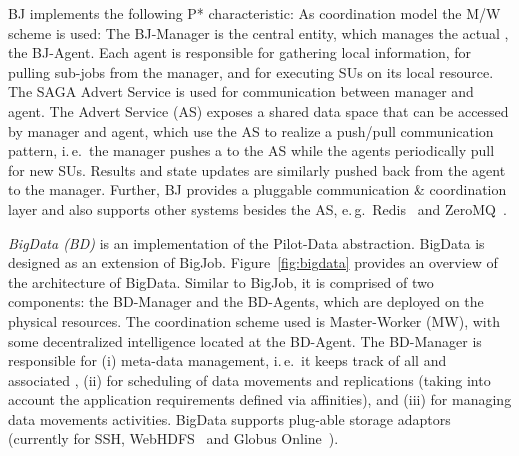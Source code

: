 \documentclass[conference]{IEEEtran}
\begin{document}
BJ implements the following P* characteristic: As coordination model
the M/W scheme is used: The BJ-Manager is the central entity, which
manages the actual \pilot, the BJ-Agent. Each agent is responsible for
gathering local information, for pulling sub-jobs from the manager,
and for executing SUs on its local resource. The SAGA Advert Service
is used for communication between manager and agent. The Advert
Service (AS) exposes a shared data space that can be accessed by
manager and agent, which use the AS to realize a push/pull
communication pattern, i.\,e.\ the manager pushes a \su to the AS while
the agents periodically pull for new SUs. Results and state updates
are similarly pushed back from the agent to the manager. Further, BJ
provides a pluggable communication \& coordination layer and also
supports other \cc systems besides the AS, e.\,g.\ Redis~\cite{redis}
and ZeroMQ~\cite{zmq}.



% 

{\it BigData (BD)} is an implementation of the Pilot-Data abstraction. BigData
is designed as an extension of BigJob. Figure~\ref{fig:bigdata}
provides an overview of the architecture of BigData. Similar to BigJob, it is
comprised of two components: the BD-Manager and the BD-Agents, which are
deployed on the physical resources. The coordination scheme used is
Master-Worker (MW), with some decentralized intelligence located at the
BD-Agent. The BD-Manager is responsible for (i) meta-data management, i.\,e.\
it keeps track of all \pd and associated \dus, (ii) for scheduling of data
movements and replications (taking into account the application requirements
defined via affinities), and (iii) for managing data movements activities.
BigData supports plug-able storage adaptors (currently for SSH,
WebHDFS~\cite{webhdfs} and Globus Online~\cite{10.1109/MIC.2011.64}).
\end{document}

